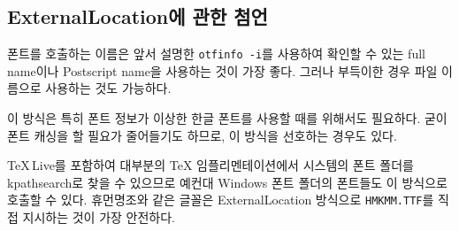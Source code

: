 \documentclass[
	12pt,
	a4paper,
	kosection,
	footnote,
	nobookmarks,
	microtype,
]{oblivoir}
\def\util#1{\texttt{#1}}
\newcommand\xobclass{x\-ob\-liv\-oir\oblivoirallowbreak}
\begin{document}
\subsection{ExternalLocation에 관한 첨언}

폰트를 호출하는 이름은 앞서 설명한 \util{otfinfo -i}를 사용하여 확인할 수 있는
full name이나 Postscript name을 사용하는 것이 가장 좋다. 그러나 부득이한 경우 
파일 이름으로 사용하는 것도 가능하다.

이 방식은 특히 폰트 정보가 이상한 한글 폰트를 사용할 때를 위해서도
필요하다.
굳이 폰트 캐싱을 할 필요가 줄어들기도 하므로, 이 방식을 선호하는 경우도 있다.

\TeX\,Live를 포함하여 대부분의 \TeX{} 임플리멘테이션에서 시스템의 폰트 폴더를 kpathsearch로
찾을 수 있으므로 예컨대 Windows 폰트 폴더의 폰트들도 이 방식으로 호출할 수 있다.
휴먼명조와 같은 글꼴은 ExternalLocation 방식으로 \verb|HMKMM.TTF|를 
직접 지시하는 것이 가장 안전하다.
\end{document}
